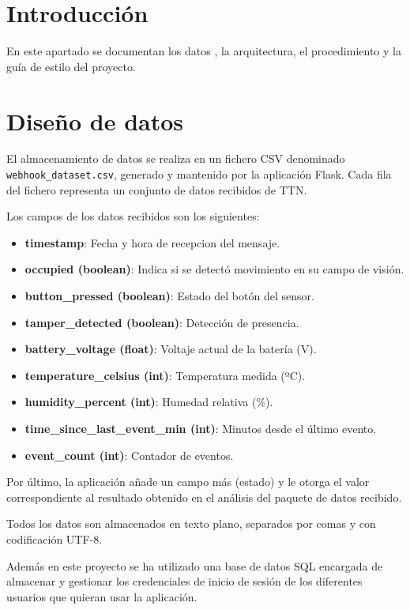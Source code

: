 
\section{Introducción}
En este apartado se documentan los datos , la arquitectura, el procedimiento y la guía de estilo del proyecto.
\section{Diseño de datos}

El almacenamiento de datos se realiza en un fichero CSV denominado \texttt{webhook\_dataset.csv}, generado y mantenido por la aplicación Flask. Cada fila del fichero representa un conjunto de datos recibidos de TTN.

Los campos de los datos recibidos son los siguientes:

\begin{itemize}
    \item \textbf{timestamp}: Fecha y hora de recepcion del mensaje.
    \item \textbf{occupied (boolean)}: Indica si se detectó movimiento en su campo de visión.
    \item \textbf{button\_pressed (boolean)}: Estado del botón del sensor.
    \item \textbf{tamper\_detected (boolean)}: Detección de presencia.
    \item \textbf{battery\_voltage (float)}: Voltaje actual de la batería (V).
    \item \textbf{temperature\_celsius (int)}: Temperatura medida (ºC).
    \item \textbf{humidity\_percent (int)}: Humedad relativa (\%).
    \item \textbf{time\_since\_last\_event\_min (int)}: Minutos desde el último evento.
    \item \textbf{event\_count (int)}: Contador de eventos.
\end{itemize}

Por último, la aplicación añade un campo más (estado) y le otorga el valor correspondiente al resultado obtenido en el análisis del paquete de datos recibido.

Todos los datos son almacenados en texto plano, separados por comas y con codificación UTF-8.

Además en este proyecto se ha utilizado una base de datos SQL encargada de almacenar y gestionar los credenciales de inicio de sesión de los diferentes usuarios que quieran usar la aplicación.

